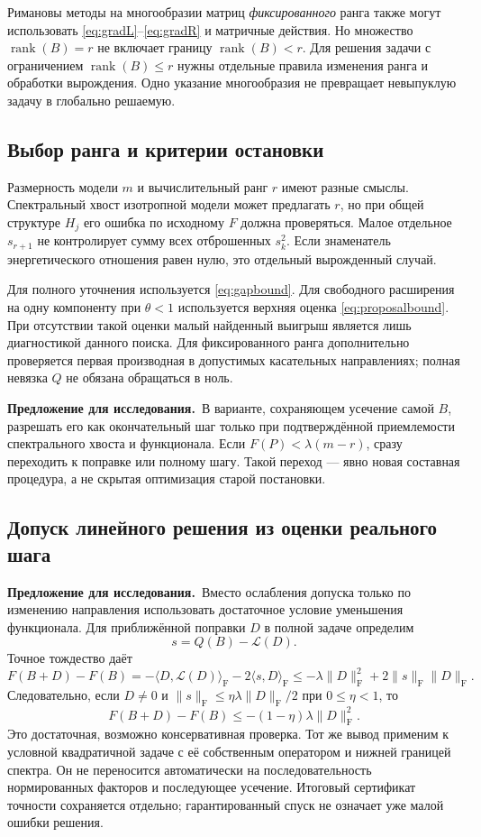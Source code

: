 \documentclass[11pt,a4paper]{article}
\numberwithin{equation}{section}
\theoremstyle{remark}
\newcommand{\F}{_{\mathrm F}}
\newcommand{\ip}[2]{\langle #1,#2\rangle_{\mathrm F}}
\DeclareMathOperator{\rank}{rank}
\newcommand{\proposal}{\par\noindent\textbf{Предложение для исследования.}\ }
\begin{document}
Римановы методы на многообразии матриц \emph{фиксированного} ранга также
могут использовать \eqref{eq:gradL}--\eqref{eq:gradR} и матричные действия.
Но множество $\rank(B)=r$ не включает границу $\rank(B)<r$.
Для решения задачи с ограничением $\rank(B)\le r$ нужны отдельные правила
изменения ранга и обработки вырождения. Одно указание многообразия
не превращает невыпуклую задачу в глобально решаемую.

\subsection{Выбор ранга и критерии остановки}
Размерность модели $m$ и вычислительный ранг $r$ имеют разные смыслы.
Спектральный хвост изотропной модели может предлагать $r$, но при общей
структуре $H_j$ его ошибка по исходному $F$ должна проверяться.
Малое отдельное $s_{r+1}$ не контролирует сумму всех отброшенных $s_k^2$.
Если знаменатель энергетического отношения равен нулю, это отдельный
вырожденный случай.

Для полного уточнения используется \eqref{eq:gapbound}.
Для свободного расширения на одну компоненту при $\theta<1$ используется
верхняя оценка \eqref{eq:proposalbound}. При отсутствии такой оценки малый
найденный выигрыш является лишь диагностикой данного поиска.
Для фиксированного ранга дополнительно проверяется первая производная
в допустимых касательных направлениях; полная невязка $Q$ не обязана
обращаться в ноль.

\proposal В варианте, сохраняющем усечение самой $B$, разрешать его как
окончательный шаг только при подтверждённой приемлемости спектрального
хвоста и функционала. Если $F(P)<\lambda(m-r)$, сразу переходить к
поправке или полному шагу. Такой переход --- явно новая составная процедура,
а не скрытая оптимизация старой постановки.

\subsection{Допуск линейного решения из оценки реального шага}
\proposal Вместо ослабления допуска только по изменению направления
использовать достаточное условие уменьшения функционала.
Для приближённой поправки $D$ в полной задаче определим
\[
 s=Q(B)-\mathcal L(D).
\]
Точное тождество даёт
\begin{equation}\label{eq:inexactdescent}
 F(B+D)-F(B)
 =-\ip{D}{\mathcal L(D)}-2\ip{s}{D}
 \le-\lambda\|D\|\F^2+2\|s\|\F\|D\|\F.
\end{equation}
Следовательно, если $D\ne0$ и
$\|s\|\F\le\eta\lambda\|D\|\F/2$ при $0\le\eta<1$, то
\begin{equation}\label{eq:safedescent}
 F(B+D)-F(B)\le-(1-\eta)\lambda\|D\|\F^2.
\end{equation}
Это достаточная, возможно консервативная проверка.
Тот же вывод применим к условной квадратичной задаче с её собственным
оператором и нижней границей спектра. Он не переносится автоматически
на последовательность нормированных факторов и последующее усечение.
Итоговый сертификат точности сохраняется отдельно; гарантированный спуск
не означает уже малой ошибки решения.
\end{document}
